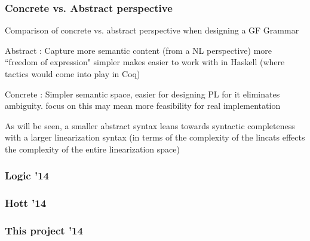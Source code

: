 \documentclass[10pt]{beamer}
\begin{document}
\begin{frame}
\frametitle{Concrete vs. Abstract perspective}

Comparison of concrete vs. abstract perspective when designing a GF Grammar

Abstract : Capture more semantic content (from a NL perspective) more ``freedom
of expression"
simpler makes easier to work with in Haskell (where tactics would come into play
in Coq)
  
Concrete : Simpler semantic space, easier for designing PL for it eliminates ambiguity.
focus on this may mean more feasibility  for real implementation

As will be seen, a smaller abstract syntax leans towards syntactic completeness
with a larger linearization syntax (in terms of the complexity of the lincats
effects the complexity of the entire linearization space)

\end{frame}

\begin{frame}
\frametitle{Logic '14}

\end{frame}

\begin{frame}
\frametitle{Hott '14}

\end{frame}

\begin{frame}
\frametitle{This project '14}

\end{frame}
\end{document}
